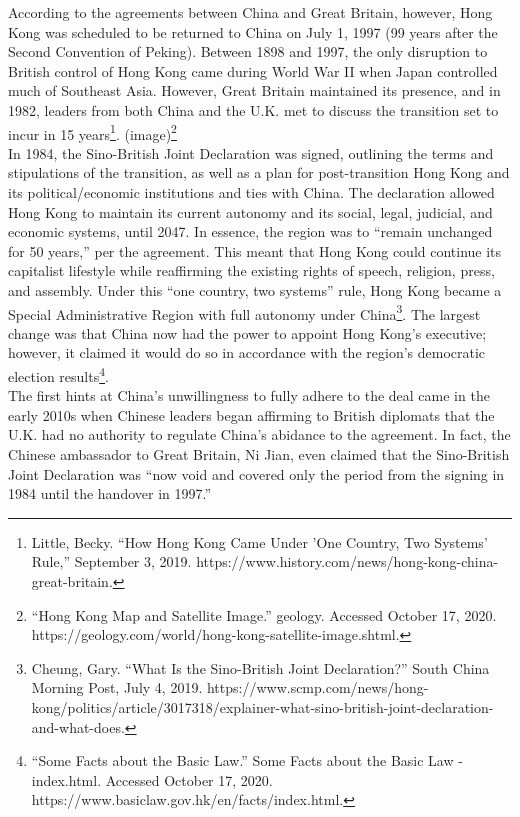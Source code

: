 \documentclass[10pt, letterpaper]{article}
\begin{document}
According to the agreements between China and Great Britain, however,
Hong Kong was scheduled to be returned to China on July 1, 1997 (99
years after the Second Convention of Peking). Between 1898 and 1997, the
only disruption to British control of Hong Kong came during World War II
when Japan controlled much of Southeast Asia. However, Great Britain
maintained its presence, and in 1982, leaders from both China and the
U.K. met to discuss the transition set to incur in 15 years\footnote{Little,
  Becky. ``How Hong Kong Came Under 'One Country, Two Systems' Rule,''
  September 3, 2019.
  https://www.history.com/news/hong-kong-china-great-britain.}.
(image)\footnote{``Hong Kong Map and Satellite Image.'' geology.
  Accessed October 17, 2020.
  https://geology.com/world/hong-kong-satellite-image.shtml.}\\

In 1984, the Sino-British Joint Declaration was signed, outlining the
terms and stipulations of the transition, as well as a plan for
post-transition Hong Kong and its political/economic institutions and
ties with China. The declaration allowed Hong Kong to maintain its
current autonomy and its social, legal, judicial, and economic systems,
until 2047. In essence, the region was to ``remain unchanged for 50
years,'' per the agreement. This meant that Hong Kong could continue its
capitalist lifestyle while reaffirming the existing rights of speech,
religion, press, and assembly. Under this ``one country, two systems''
rule, Hong Kong became a Special Administrative Region with full
autonomy under China\footnote{Cheung, Gary. ``What Is the Sino-British
  Joint Declaration?'' South China Morning Post, July 4, 2019.
  https://www.scmp.com/news/hong-kong/politics/article/3017318/explainer-what-sino-british-joint-declaration-and-what-does.}.
The largest change was that China now had the power to appoint Hong
Kong's executive; however, it claimed it would do so in accordance with
the region's democratic election results\footnote{``Some Facts about the
  Basic Law.'' Some Facts about the Basic Law - index.html. Accessed
  October 17, 2020. https://www.basiclaw.gov.hk/en/facts/index.html.}.\\

The first hints at China's unwillingness to fully adhere to the deal
came in the early 2010s when Chinese leaders began affirming to British
diplomats that the U.K. had no authority to regulate China's abidance to
the agreement. In fact, the Chinese ambassador to Great Britain, Ni
Jian, even claimed that the Sino-British Joint Declaration was ``now
void and covered only the period from the signing in 1984 until the
handover in 1997.''\\
\end{document}
